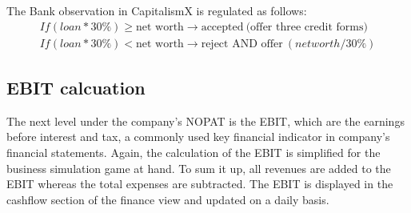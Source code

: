 The Bank observation in CapitalismX is regulated as follows:
\begin{equation}
\begin{aligned}
    If (loan * 30\% ) \geq  \text{net worth} \xrightarrow{} \text{accepted} \ \text{(offer three credit forms)} \\
    If (loan * 30\%) < \text{net worth} \xrightarrow{} \text{reject AND offer} \ (net worth / 30\%)
\end{aligned}    
\end{equation}


\subsection{EBIT calcuation}

The next level under the company's NOPAT is the EBIT, which are the earnings before interest and tax, a commonly used key financial indicator in company's financial statements. \cite{lee_e_2006} Again, the calculation of the EBIT is simplified for the business simulation game at hand. To sum it up, all revenues are added to the EBIT whereas the total expenses are subtracted. The EBIT is displayed in the cashflow section of the finance view and updated on a daily basis.

